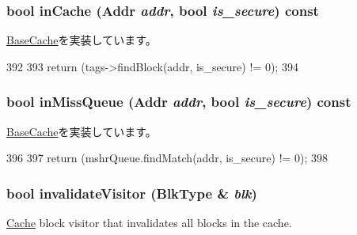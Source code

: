 \hypertarget{classCache_a2a9a72a19c7910262542bc96de2488fb}{
\subsubsection[{inCache}]{\setlength{\rightskip}{0pt plus 5cm}bool inCache ({\bf Addr} {\em addr}, \/  bool {\em is\_\-secure}) const}}
\label{classCache_a2a9a72a19c7910262542bc96de2488fb}


\hyperlink{classBaseCache_a2ac85ef6d4c6f16111c1da31c2363aa7}{BaseCache}を実装しています。


\begin{DoxyCode}
392                                                   {
393         return (tags->findBlock(addr, is_secure) != 0);
394     }
\end{DoxyCode}
\hypertarget{classCache_a01f08168ad1a2fee8ccff0f562da70de}{
\subsubsection[{inMissQueue}]{\setlength{\rightskip}{0pt plus 5cm}bool inMissQueue ({\bf Addr} {\em addr}, \/  bool {\em is\_\-secure}) const}}
\label{classCache_a01f08168ad1a2fee8ccff0f562da70de}


\hyperlink{classBaseCache_abb47bf01a0bb0aa1c4e3d60fc2ca8175}{BaseCache}を実装しています。


\begin{DoxyCode}
396                                                       {
397         return (mshrQueue.findMatch(addr, is_secure) != 0);
398     }
\end{DoxyCode}
\hypertarget{classCache_a0a830cf4879a74de1790653f861c7d93}{
\subsubsection[{invalidateVisitor}]{\setlength{\rightskip}{0pt plus 5cm}bool invalidateVisitor ({\bf BlkType} \& {\em blk})}}
\label{classCache_a0a830cf4879a74de1790653f861c7d93}
\hyperlink{classCache}{Cache} block visitor that invalidates all blocks in the cache.

